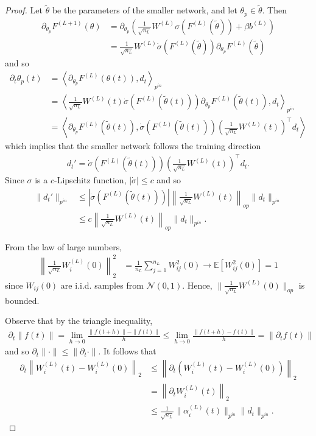 \documentclass[10pt]{article}
\newcommand{\EE}{\mathbb{E}}
\newcommand{\NN}{\mathcal{N}}
\newcommand{\inner}[2]{\left\langle #1, #2 \right\rangle}
\newcommand{\paran}[1]{{( #1 )}}
\newcommand{\pin}{{p^{in}}}
\begin{document}
\begin{proof}
Let $\tilde{\theta}$ be the parameters of the smaller network, and let $\theta_p \in \tilde{\theta}$. Then
\begin{align*}
\partial_{\theta_p} F^\paran{L + 1}(\theta) &= \partial_{\theta_p} \left( \frac{1}{\sqrt{n_L}} W^\paran{L} \sigma( F^\paran{L}(\tilde{\theta}) ) + \beta b^\paran{L} \right) \\
&= \frac{1}{\sqrt{n_L}} W^\paran{L} \dot{\sigma}( F^\paran{L}(\tilde{\theta}) ) \partial_{\theta_p} F^\paran{L}(\tilde{\theta})
\end{align*}
and so
\begin{align*}
\partial_t \theta_p(t) &= \inner{\partial_{\theta_p} F^\paran{L}(\theta(t))}{d_t}_\pin \\
&= \inner{\frac{1}{\sqrt{n_L}} W^\paran{L}(t) \dot{\sigma}( F^\paran{L}(\tilde{\theta}(t)) ) \partial_{\theta_p} F^\paran{L}(\tilde{\theta}(t))}{d_t}_\pin \\
&= \inner{\partial_{\theta_p} F^\paran{L}(\tilde{\theta}(t))}{\dot{\sigma}( F^\paran{L}(\tilde{\theta}(t)) ) \left( \frac{1}{\sqrt{n_L}} W^\paran{L}(t) \right)^\top d_t}
\end{align*}
which implies that the smaller network follows the training direction
\begin{align*}
d_t' = \dot{\sigma}( F^\paran{L}(\tilde{\theta}(t)) ) \left( \frac{1}{\sqrt{n_L}} W^\paran{L}(t) \right)^\top d_t.
\end{align*}
Since $\sigma$ is a $c$-Lipschitz function, $|\dot{\sigma}| \leq c$ and so
\begin{align*}
\|d_t'\|_\pin &\leq |\dot{\sigma}( F^\paran{L}(\tilde{\theta}(t)) )| \left\| \frac{1}{\sqrt{n_L}} W^\paran{L}(t) \right\|_{op} \|d_t\|_\pin \\
&\leq c \left\| \frac{1}{\sqrt{n_L}} W^\paran{L}(t) \right\|_{op} \|d_t\|_\pin.
\end{align*}

From the law of large numbers,
\begin{align*}
\left\| \frac{1}{\sqrt{n_L}} W^\paran{L}_i(0) \right\|_2^2 &= \frac{1}{n_L} \sum_{j = 1}^{n_L} W_{ij}^2(0) \rightarrow \EE[W_{ij}^2(0)] = 1
\end{align*}
since $W_{ij}(0)$ are i.i.d. samples from $\NN(0,1)$. Hence, $\|\frac{1}{\sqrt{n_L}} W^\paran{L}(0)\|_{op}$ is bounded.

Observe that by the triangle inequality,
\begin{align*}
\partial_t \|f(t)\| = \lim_{h \rightarrow 0} \frac{\|f(t + h)\| - \|f(t)\|}{h} \leq \lim_{h \rightarrow 0} \frac{\|f(t + h) - f(t)\|}{h} = \| \partial_t f(t)\|
\end{align*}
and so $\partial_t \|\cdot\| \leq \| \partial_t \cdot \|$. It follows that
\begin{align*}
\partial_t \left\| W_i^\paran{L}(t) - W_i^\paran{L}(0) \right\|_2 &\leq \left\| \partial_t \left( W_i^\paran{L}(t) - W_i^\paran{L}(0) \right) \right\|_2 \\
&= \left\| \partial_t W_i^\paran{L}(t) \right\|_2 \\
&\leq \frac{1}{\sqrt{n_L}} \| \alpha_i^\paran{L}(t) \|_\pin \|d_t\|_\pin.
\end{align*}


\end{proof}
\end{document}
